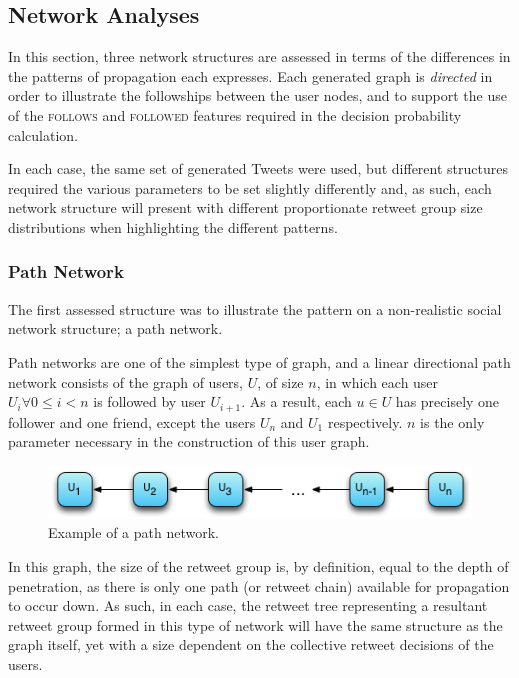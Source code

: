 \subsection{Network Analyses}
In this section, three network structures are assessed in terms of the differences in the patterns of propagation each expresses. Each generated graph is \textit{directed} in order to illustrate the followships between the user nodes, and to support the use of the \textsc{follows} and \textsc{followed} features required in the decision probability calculation.

In each case, the same set of generated Tweets were used, but different structures required the various parameters to be set slightly differently and, as such, each network structure will present with different proportionate retweet group size distributions when highlighting the different patterns.


\subsubsection{Path Network}
The first assessed structure was to illustrate the pattern on a non-realistic social network structure; a path network.

Path networks are one of the simplest type of graph, and a linear directional path network consists of the graph of users, $U$, of size $n$, in which each user $U_i \forall 0 \leq i < n$ is followed by user $U_{i+1}$. As a result, each $u \in U$ has precisely one follower and one friend, except the users $U_n$ and $U_1$ respectively. $n$ is the only parameter necessary in the construction of this user graph.

\begin{figure}[h]
\centering
\includegraphics[scale=0.8]{4.Chapter2/Media/path_network.png} 
\caption{Example of a path network.}
\label{fig:path_network}
\end{figure}

In this graph, the size of the retweet group is, by definition, equal to the depth of penetration, as there is only one path (or retweet chain) available for propagation to occur down. As such, in each case, the retweet tree representing a resultant retweet group formed in this type of network will have the same structure as the graph itself, yet with a size dependent on the collective retweet decisions of the users.


